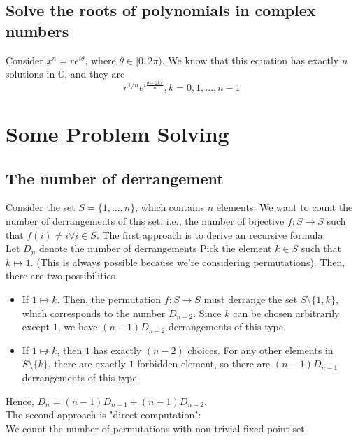 \documentclass{article}
\theoremstyle{definition}
\theoremstyle{definition}
\theoremstyle{definition}
\theoremstyle{definition}
\theoremstyle{definition}
\theoremstyle{definition}
\theoremstyle{definition}
\theoremstyle{definition}
\theoremstyle{definition}
\newcommand{\CC}{\mathbb{C}}
\begin{document}
\subsection{Solve the roots of polynomials in complex numbers}
Consider $x^n=re^{i\theta}$, where $\theta\in[0,2\pi)$. We know that this equation has exactly $n$ solutions in $\CC$,
and they are
\[
r^{1/n}e^{i\frac{\theta+2k\pi}{n}}, k=0,1,...,n-1
\]
\section{Some Problem Solving}
\subsection{The number of derrangement}
Consider the set $S=\{1,...,n\}$, which contains $n$ elements. We want to count the number of derrangements of this set, i.e., the number of bijective $f:S\to S$ such that $f(i)\neq i\forall i\in S$.
The first approach is to derive an recursive formula:\\
Let $D_n$ denote the number of derrangements
Pick the element $k\in S$ such that $k\mapsto 1$. (This is always possible because we're considering permutations). Then, there are two possibilities.
\begin{itemize}
    \item If $1\mapsto k$. Then, the permutation $f:S\to S$ must derrange the set $S\setminus\{1,k\}$, which corresponds to the number $D_{n-2}$. Since $k$ can be chosen arbitrarily except $1$, we have $(n-1)D_{n-2}$ derrangements of this type.
    \item If $1\not\mapsto k$, then $1$ has exactly $(n-2)$ choices. For any other elements in $S\setminus\{k\}$, there are exactly $1$ forbidden element, so there are $(n-1)D_{n-1}$ derrangements of this type.
\end{itemize}
Hence, $D_n=(n-1)D_{n-1}+(n-1)D_{n-2}$.\\
The second approach is "direct computation":\\
We count the number of permutations with non-trivial fixed point set. %
\end{document}

